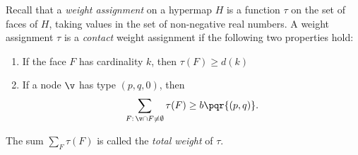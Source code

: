\begin{definition}
%
  Recall that a {\it weight assignment\/} on a hypermap $H$ is a
  function $\tau$ on the set of faces of $H$, taking values in the set
  of non-negative real numbers. A weight assignment $\tau$
is a {\it contact}
  weight assignment if the following two properties hold:
%
\begin{enumerate}
\item If the face $F$ has cardinality $k$, then
$\tau(F) \ge d(k)$
\item If a node $\v$ has type $(p,q,0)$, then
  \begin{displaymath}\sum_{F:\,\v\cap F\ne\emptyset} \tau(F) \ge
    b{\pqr{(p,q)}}.\end{displaymath}
\end{enumerate}
The sum $\sum_F \tau(F)$ is called the {\it total weight} of $\tau$.
%
\end{definition}


